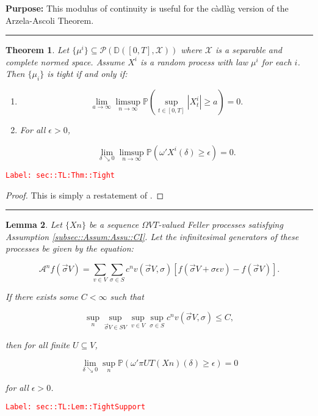 \documentclass[12pt]{article}
\newcommand{\mb}{\mathbb}
\newcommand{\mc}{\mathcal}
\newcommand{\ra}{\rightarrow}
\newcommand{\ep}{\epsilon}
\newcommand{\tr}{\textcolor{red}}
\newcommand{\labe}[1]{\tr{\texttt{Label: #1}}}
\newcommand{\purpose}{\textbf{Purpose: }}
\newcommand{\lin}{\rule{\linewidth}{0.4 pt}}
\newcommand{\pr}{\mb{P}}							%
\newcommand{\cad}{\mb{D}}							%
\renewcommand{\v}{v}							%
\renewcommand{\U}{U}							%
\renewcommand{\S}{S}							%
\newcommand{\s}{\sigma}							%
\newcommand{\sv}{\vec{\s}}						%
\newcommand{\ev}{\ep}							%
\newcommand{\T}{T}								%
\renewcommand{\t}{t}							%
\newcommand{\proj}{\pi}							%
\newcommand{\X}{X}								%
\newcommand{\IG}{\mc{A}}						%
\newcommand{\IGr}{c}							%
\newcommand{\const}{C}							%
\newcommand{\sln}[1]{^{#1}}						%
\newcommand{\cmodu}{\omega'}					%
\newcommand{\m}{\mu}							%
\newcommand{\spce}{\mc{X}}						%
\newtheorem{thms}{Theorem}[section]
\newtheorem{lem}[thms]{Lemma}
\begin{document}
\purpose This modulus of continuity is useful for the c\`adl\`ag version of the Arzela-Ascoli Theorem.

\lin

\begin{thms}
Let \(\{\m^i\}\subseteq \mc{P}\left(\cad([0,T],\spce)\right)\) where \(\spce\) is a separable and complete normed space. Assume \(\X^i\) is a random process with law \(\m^i\) for each \(i\). Then \(\{\m_i\}\) is tight if and only if:

\begin{enumerate}[(1)]
\item 

\[\lim_{a \ra \infty}\limsup_{n \ra\infty} \pr\left(\sup_{\t \in [0,T]} |\X^i_\t| \geq a\right) = 0.\]

\item For all \(\ep > 0\),

\[\lim_{\delta \searrow 0}\limsup_{n\ra\infty} \pr\left(\cmodu{\X^i}(\delta) \geq \ep\right) = 0.\]
\end{enumerate}
\label{sec::TL:Thm::Tight}
\end{thms}
\labe{sec::TL:Thm::Tight}

\begin{proof}
This is simply a restatement of \cite[Theorem 13.2]{Bil99}.
\end{proof}

\lin

\begin{lem}
Let \(\{\X{}{}{n}\}\) be a sequence \(\Omega{V}{\T}\)-valued Feller processes satisfying Assumption \ref{subsec::Assum:Assu::CI}. Let the infinitesimal generators of these processes be given by the equation:

\[\IG\sln{n}f(\sv{}{V}) = \sum_{\v\in V}\sum_{\s \in \S} \IGr\sln{n}{\v}(\sv{}{V},\s)[f(\sv{}{V} + \s\ev{\v}) - f(\sv{}{V})].\]

If there exists some \(\const{} < \infty\) such that

\[\sup_{n}\sup_{\sv{}{V}\in \S{V}}\sup_{\v\in V}\sup_{\s\in \S} \IGr\sln{n}{\v}(\sv{}{V},\s) \leq \const{},\]

then for all finite \(\U \subseteq V\),

\[\lim_{\delta \searrow 0} \sup_n \pr\left(\cmodu{\proj{\U}{\T}\left(\X{}{}{n}\right)}(\delta) \geq \ep\right) = 0\]

for all \(\ep > 0\).
\label{sec::TL:Lem::TightSupport}
\end{lem}
\labe{sec::TL:Lem::TightSupport}
\end{document}
